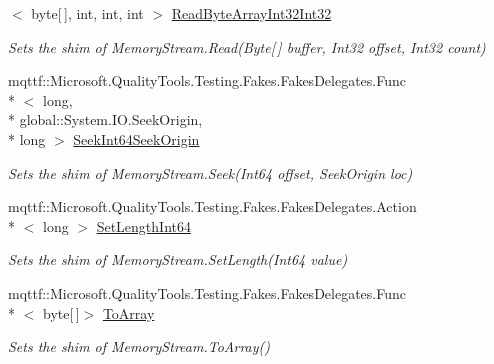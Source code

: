 \begin{DoxyCompactItemize}
$<$ byte\mbox{[}$\,$\mbox{]}, int, int, int $>$ \hyperlink{class_system_1_1_i_o_1_1_fakes_1_1_shim_memory_stream_aae81394963bb037022edf0a5f3fc40a6}{Read\-Byte\-Array\-Int32\-Int32}
\begin{DoxyCompactList}\small\item\em Sets the shim of Memory\-Stream.\-Read(\-Byte\mbox{[}$\,$\mbox{]} buffer, Int32 offset, Int32 count)\end{DoxyCompactList}\item 
mqttf\-::\-Microsoft.\-Quality\-Tools.\-Testing.\-Fakes.\-Fakes\-Delegates.\-Func\\*
$<$ long, \\*
global\-::\-System.\-I\-O.\-Seek\-Origin, \\*
long $>$ \hyperlink{class_system_1_1_i_o_1_1_fakes_1_1_shim_memory_stream_a47efbf35de0909277fabae75e6ab13ed}{Seek\-Int64\-Seek\-Origin}
\begin{DoxyCompactList}\small\item\em Sets the shim of Memory\-Stream.\-Seek(\-Int64 offset, Seek\-Origin loc)\end{DoxyCompactList}\item 
mqttf\-::\-Microsoft.\-Quality\-Tools.\-Testing.\-Fakes.\-Fakes\-Delegates.\-Action\\*
$<$ long $>$ \hyperlink{class_system_1_1_i_o_1_1_fakes_1_1_shim_memory_stream_ae55e91f9ba74561bd753f3ce29c66b38}{Set\-Length\-Int64}
\begin{DoxyCompactList}\small\item\em Sets the shim of Memory\-Stream.\-Set\-Length(\-Int64 value)\end{DoxyCompactList}\item 
mqttf\-::\-Microsoft.\-Quality\-Tools.\-Testing.\-Fakes.\-Fakes\-Delegates.\-Func\\*
$<$ byte\mbox{[}$\,$\mbox{]}$>$ \hyperlink{class_system_1_1_i_o_1_1_fakes_1_1_shim_memory_stream_abb6e5adf4551663163706361fb977e58}{To\-Array}
\begin{DoxyCompactList}\small\item\em Sets the shim of Memory\-Stream.\-To\-Array()\end{DoxyCompactList}\item 

\end{DoxyCompactItemize}
